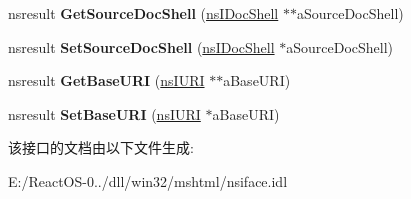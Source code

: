 \begin{DoxyCompactItemize}
\item 
\mbox{\label{interfacens_i_doc_shell_load_info_a7930d350054d0f87bcc5cbfe70bc85e1}} 
nsresult {\bfseries Get\+Source\+Doc\+Shell} (\hyperlink{interfacens_i_doc_shell}{ns\+I\+Doc\+Shell} $\ast$$\ast$a\+Source\+Doc\+Shell)
\item 
\mbox{\label{interfacens_i_doc_shell_load_info_ab1cd39b36cd1e662771ac23d431d48ee}} 
nsresult {\bfseries Set\+Source\+Doc\+Shell} (\hyperlink{interfacens_i_doc_shell}{ns\+I\+Doc\+Shell} $\ast$a\+Source\+Doc\+Shell)
\item 
\mbox{\label{interfacens_i_doc_shell_load_info_a8134c9f2a37d41f9ea92aaf03d87dced}} 
nsresult {\bfseries Get\+Base\+U\+RI} (\hyperlink{interfacens_i_u_r_i}{ns\+I\+U\+RI} $\ast$$\ast$a\+Base\+U\+RI)
\item 
\mbox{\label{interfacens_i_doc_shell_load_info_ae0354ac3b1b49488ac62c0f3cff8c650}} 
nsresult {\bfseries Set\+Base\+U\+RI} (\hyperlink{interfacens_i_u_r_i}{ns\+I\+U\+RI} $\ast$a\+Base\+U\+RI)
\end{DoxyCompactItemize}


该接口的文档由以下文件生成\+:\begin{DoxyCompactItemize}
\item 
E\+:/\+React\+O\+S-\/0../dll/win32/mshtml/nsiface.\+idl\end{DoxyCompactItemize}
